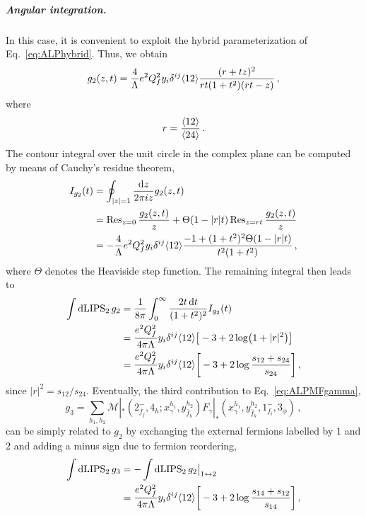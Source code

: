 \subparagraph{Angular integration.}
In this case, it is convenient to exploit the hybrid parameterization of
Eq.~\eqref{eq:ALPhybrid}. Thus, we obtain
\begin{equation}
    g_2(z,t) = \frac{4}{\Lambda}e^2 Q_f^2 y_i\delta^{ij}\langle 1 2 \rangle\frac{(r+tz)^2}{rt(1+t^2)(rt-z)}\,,
\end{equation}
where
\begin{equation}
    r = \frac{\langle 1 2 \rangle}{\langle 2 4 \rangle}\,.
\end{equation}
The contour integral over the unit circle in the complex plane can be computed by means of
Cauchy's residue theorem,
\begin{align}
    I_{g_2}(t) &= \oint_{|z|=1}\frac{\text{d}z}{2\pi i z}g_2(z,t)\nonumber \\
    &= \Res_{z=0}\frac{g_2(z,t)}{z} + \Theta(1-|r|t)\Res_{z=rt}\frac{g_2(z,t)}{z}\nonumber \\
    &= -\frac{4}{\Lambda}e^2 Q_f^2 y_i\delta^{ij}\agl{1}{2} \frac{-1+(1+t^2)^2 \Theta(1-|r|t)}{t^2(1+t^2)}\,,
\end{align}
where $\Theta$ denotes the Heaviside step function.
The remaining integral then leads to
\begin{align}
    \int \text{dLIPS}_2\, g_2 &= \frac{1}{8\pi}\int_0^\infty \frac{2t\,\text{d}t}{(1+t^2)^2}I_{g_2}(t)\nonumber \\
    &= \frac{e^2 Q_f^2}{4\pi\Lambda}y_i\delta^{ij}\langle 1 2 \rangle\big[-3+2\log(1+|r|^2)\big]\nonumber  \\
    &= \frac{e^2 Q_f^2}{4\pi\Lambda}y_i\delta^{ij}\langle 1 2 \rangle\bigg[-3+2\log\frac{s_{12}+s_{24}}{s_{24}}\bigg]\,,
\end{align}
since $|r|^2=s_{12}/s_{24}$.
Eventually, the third contribution to Eq.~\eqref{eq:ALPMFgamma},
\begin{equation}
    g_3 = \sum_{h_1,h_2} \mathcal M|_*(2_{\bar f_j}^-,4_h;x_\gamma^{h_1},y_{\bar f_k}^{h_2}) F_\gamma|_*(x_\gamma^{h_1},y_{\bar f_k}^{h_2},1_{f_i}^-,3_\phi)\,,
\end{equation}
can be simply related to $g_2$ by exchanging the external fermions labelled by $1$ and $2$ and
adding a minus sign due to fermion reordering,
\begin{align}
    \int \text{dLIPS}_2\,g_3 &= -\int \text{dLIPS}_2\,g_2\big|_{1\leftrightarrow 2}\nonumber\\
    & = \frac{e^2 Q_f^2}{4\pi\Lambda}y_i\delta^{ij}\langle 1 2 \rangle\bigg[-3+2\log\frac{s_{14}+s_{12}}{s_{14}}\bigg]\,,
    \label{eq:ALPg3_reorder}
\end{align}
